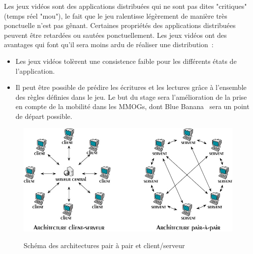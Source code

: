 	\par Les jeux vidéos sont des applications distribuées qui ne sont pas dites "critiques" (temps réel "mou"), le fait que le jeu ralentisse légèrement de manière très ponctuelle n'est pas gênant. Certaines propriétés des applications distribuées peuvent être retardées ou sautées ponctuellement. Les jeux vidéos ont des avantages qui font qu'il sera moins ardu de réaliser une distribution~\cite{1267692}:
	\begin{itemize}
		\renewcommand{\labelitemi}{$\bullet$}
		\item Les jeux vidéos tolèrent une consistence faible pour les différents états de l'application.
		\item Il peut être possible de prédire les écritures et les lectures grâce à l'ensemble des règles définies dans le jeu. Le but du stage sera l'amélioration de la prise en compte de la mobilité dans les MMOGs, dont Blue Banana~\cite{191} sera un point de départ possible.
	\end{itemize}
	\vspace{1cm}
	\begin{figure}[!h]
	\centering
	\includegraphics[scale=0.5]{./Ressources/Images/p2p-85145.png}\\
	\caption{Schéma des architectures pair à pair et client/serveur}
	\label{P2P/ClServ}
	\end{figure} 
\newpage
